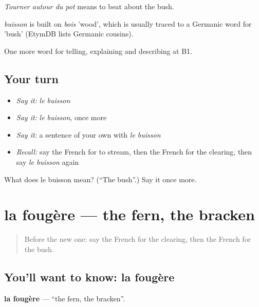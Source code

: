 \emph{Tourner autour du pot} means to beat about the bush.

\begin{cousinweb}
\emph{buisson} is built on \emph{bois} 'wood', which is usually traced to a Germanic word for 'bush' (EtymDB lists Germanic cousins).
\end{cousinweb}

\begin{grammarlens}[title={What you've built}]
One more word for telling, explaining and describing at B1.
\end{grammarlens}

\subsection*{Your turn}
\begin{itemize}
\raggedright
  \item \emph{Say it:} \emph{le buisson}
  \item \emph{Say it:} \emph{le buisson}, once more
  \item \emph{Say it:} a sentence of your own with \emph{le buisson}
  \item \emph{Recall:} say the French for to stream, then the French for the clearing, then say \emph{le buisson} again
\end{itemize}

\begin{tcolorbox}[breakable,colback=teal!4,colframe=teal!35!black,title={Before you move on}]
What does le buisson mean? (\textquotedblleft{}The bush\textquotedblright{}.) Say it once more.
\end{tcolorbox}
\section[la fougère]{la fougère — the fern, the bracken}

\label{lesson:FR-C457-fougere}



\begin{quote}
Before the new one: say the French for the clearing, then the French for the bush.
\end{quote}

\subsection*{You'll want to know: la fougère}
\textbf{la fougère} — \textquotedblleft{}the fern, the bracken\textquotedblright{}.

